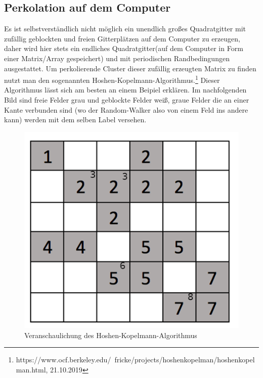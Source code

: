 \documentclass[a4paper, 12pt]{scrartcl}
\begin{document}
\subsection{Perkolation auf dem Computer}
Es ist selbstverständlich nicht möglich ein unendlich großes Quadratgitter mit zufällig geblockten und freien Gitterplätzen auf dem Computer zu erzeugen, daher wird hier stets ein endliches Quadratgitter(auf dem Computer in Form einer Matrix/Array gespeichert) und mit periodischen Randbedingungen ausgestattet. Um perkolierende Cluster dieser zufällig erzeugten Matrix zu finden nutzt man den sogenannten Hoshen-Kopelmann-Algorithmus.\footnote[3]{https://www.ocf.berkeley.edu/~fricke/projects/hoshenkopelman/hoshenkopelman.html, 21.10.2019}
Dieser Algorithmus lässt sich am besten an einem Beipiel erklären. Im nachfolgenden Bild sind freie Felder grau und geblockte Felder weiß, graue Felder die an einer Kante verbunden sind (wo der Random-Walker also von einem Feld ins andere kann) werden mit dem selben Label versehen.
\begin{figure}[h!]
\centering
\includegraphics[scale=0.5]{H-K_algorithm.png}
\caption{Veranschaulichung des Hoshen-Kopelmann-Algorithmus}
\end{figure}

\newpage
\end{document}
